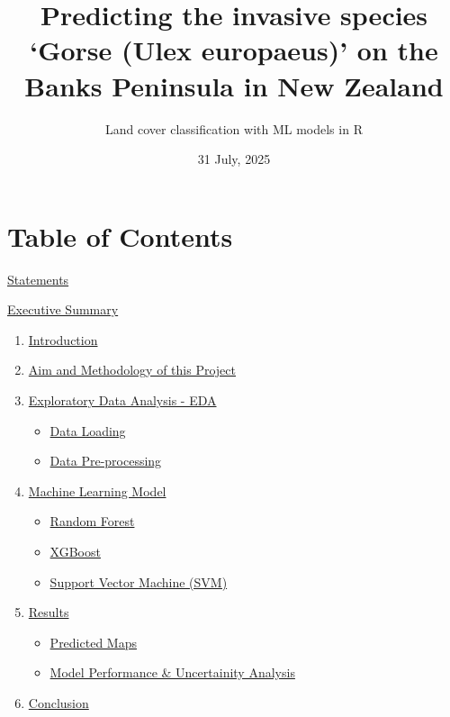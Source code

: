 \documentclass[
]{article}
\title{Predicting the invasive species `Gorse (Ulex europaeus)' on the
Banks Peninsula in New Zealand}
\subtitle{Land cover classification with ML models in R}
\author{}
\date{\vspace{-2.5em}31 July, 2025}
\begin{document}
\maketitle

{
\setcounter{tocdepth}{6}
\tableofcontents
}
\section{Table of Contents}\label{table-of-contents}

\hyperref[statements]{Statements}

\hyperref[executive-summary]{Executive Summary}

\begin{enumerate}
\def\labelenumi{\arabic{enumi}.}
\item
  \hyperref[introduction]{Introduction}
\item
  \hyperref[aim-and-methodology-of-this-project]{Aim and Methodology of
  this Project}
\item
  \hyperref[exploratory-data-analysis-EDA]{Exploratory Data Analysis -
  EDA}

  \begin{itemize}
  \item
    \hyperref[data-loading]{Data Loading}
  \item
    \hyperref[data-pre-processing]{Data Pre-processing}
  \end{itemize}
\item
  \hyperref[machine-learning-model]{Machine Learning Model}

  \begin{itemize}
  \item
    \hyperref[random-forest]{Random Forest}
  \item
    \hyperref[xgboost]{XGBoost}
  \item
    \hyperref[support-vector-machine-svm]{Support Vector Machine (SVM)}
  \end{itemize}
\item
  \hyperref[results]{Results}

  \begin{itemize}
  \item
    \hyperref[predicted-maps]{Predicted Maps}
  \item
    \hyperref[model-performance-ux26-uncertainity-analysis]{Model
    Performance \& Uncertainity Analysis}
  \end{itemize}
\item
  \hyperref[conclusion]{Conclusion}
\end{enumerate}
\end{document}
